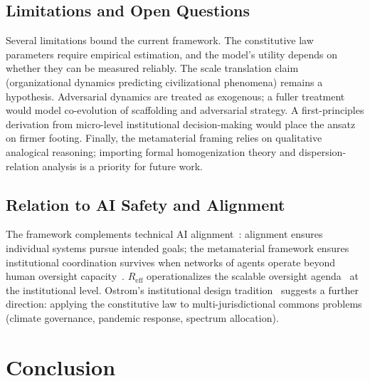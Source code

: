 \documentclass[runningheads]{llncs}
\begin{document}
\subsection{Limitations and Open Questions}

Several limitations bound the current framework. The constitutive law parameters require empirical estimation, and the model's utility depends on whether they can be measured reliably. The scale translation claim (organizational dynamics predicting civilizational phenomena) remains a hypothesis. Adversarial dynamics are treated as exogenous; a fuller treatment would model co-evolution of scaffolding and adversarial strategy. A first-principles derivation from micro-level institutional decision-making would place the ansatz on firmer footing. Finally, the metamaterial framing relies on qualitative analogical reasoning; importing formal homogenization theory and dispersion-relation analysis is a priority for future work.

\subsection{Relation to AI Safety and Alignment}

The framework complements technical AI alignment~\cite{amodei2016concrete,gabriel2020artificial}: alignment ensures individual systems pursue intended goals; the metamaterial framework ensures institutional coordination survives when networks of agents operate beyond human oversight capacity~\cite{hendrycks2022xrisk}. $R_{\mathrm{eff}}$ operationalizes the scalable oversight agenda~\cite{bowman2022measuring} at the institutional level. Ostrom's institutional design tradition~\cite{ostrom1990governing} suggests a further direction: applying the constitutive law to multi-jurisdictional commons problems (climate governance, pandemic response, spectrum allocation).


\section{Conclusion}
\label{sec:conclusion}
\end{document}
